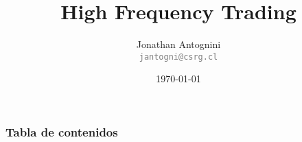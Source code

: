\documentclass{beamer}
\title[HFT]{High Frequency Trading}
\author{Jonathan Antognini \\
        \small{\textcolor{gray}{\texttt{jantogni@csrg.cl}}}}
\institute[UTFSM]{
Universidad Técnica Fedrico Santa María
}
\date{\today}
\begin{document}
\begin{frame}[t,plain]
\titlepage
\end{frame}



\begin{frame}
	\frametitle{Tabla de contenidos}
	\tableofcontents
\end{frame}





\begin{frame}[t,plain]
\titlepage
\end{frame}
\end{document}
